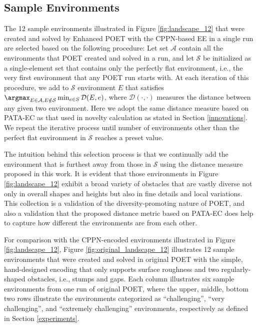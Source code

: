 \documentclass{article}
\newcommand{\todo}[1]{\comments{\textcolor{red}{[TODO: #1]}}}
\newcommand{\comments}[1]{#1} %
\begin{document}
\subsection{Sample Environments}
\label{appendix:app_landscape_samples}
The 12 sample environments illustrated in Figure \ref{fig:landscape_12}   that were created and solved by Enhanced POET with the CPPN-based EE in a single run are selected based on the following procedure: Let set $\mathcal{A}$ contain all the environments that POET created and solved in a run, and let $\mathcal{S}$ be initialized as a single-element set that contains only the perfectly flat environment, i.e., the very first environment that any POET run starts with. At each iteration of this procedure, we add to $\mathcal{S}$ environment $E$ that satisfies 
$\argmax_{E \in \mathcal{A}, E \notin \mathcal{S}} \min_{e \in S} \mathcal{D}(E, e)$, where $\mathcal{D}(\cdot,\cdot)$ measures the distance between any given two environment. Here we adopt the same distance measure based on PATA-EC as that used in novelty calculation as stated in Section \ref{innovations}. We repeat the iterative process until number of environments other than the perfect flat environment in $\mathcal{S}$ reaches a preset value. 

The intuition behind this selection process is that we continually add the environment that is furthest away from those in $\mathcal{S}$ using the distance measure proposed in this work. It is evident that those environments in Figure \ref{fig:landscape_12} exhibit a broad variety of obstacles that are vastly diverse not only in overall shapes and heights but also in fine details and local variations. This collection is a validation of the diversity-promoting nature of POET, and also a validation that the proposed distance metric based on PATA-EC does help to capture how different the environments are from each other.



For comparison with the CPPN-encoded environments illustrated in Figure \ref{fig:landscape_12}, Figure \ref{fig:original_landscape_12} illustrates 12 sample environments that were created and solved in original POET with the simple, hand-designed encoding that only supports surface roughness and two regularly-shaped obstacles, i.e., stumps and gaps. Each column illustrates six sample environments from one run of original POET, where the upper, middle, bottom two rows illustrate the environments categorized as ``challenging'', ``very challenging'', and ``extremely challenging'' environments, respectively as defined in Section \ref{experiments}.
\end{document}
